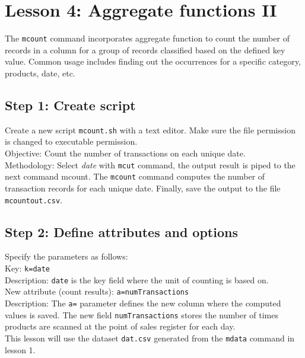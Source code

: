

%



\section{Lesson 4: Aggregate functions II }

The \verb|mcount| command incorporates aggregate function to count the number of records in a column for a group of records classified based on the defined key value. Common usage includes finding out the occurrences for a specific category, products, date, etc. 


\subsection{Step 1: Create script}

Create a new script \verb|mcount.sh| with a text editor. Make sure the file permission is changed to executable permission. \\

Objective: Count the number of transactions on each unique date.  \\

Methodology: Select \emph{date} with \verb|mcut| command, the output result is piped to the next command mcount. The \verb|mcount| command computes the number of transaction records for each unique date. Finally, save the output to the file \verb|mcountout.csv|.


 \subsection{Step 2: Define attributes and options }

{\setlength{\parindent}{0cm}

Specify the parameters as follows: \\

Key: 		\verb|k=date| \\
Description: 	\verb|date| is the key field where the unit of counting is based on.\\

New attribute (count results): 	\verb|a=numTransactions| \\
Description:  		The \verb|a=| parameter defines the new column where the computed values is saved. The new field  \verb|numTransactions| stores the number of times products are scanned at the point of sales register for each day. \\

This lesson will use the dataset \verb|dat.csv| generated from the \verb|mdata| command in lesson 1. 
}

